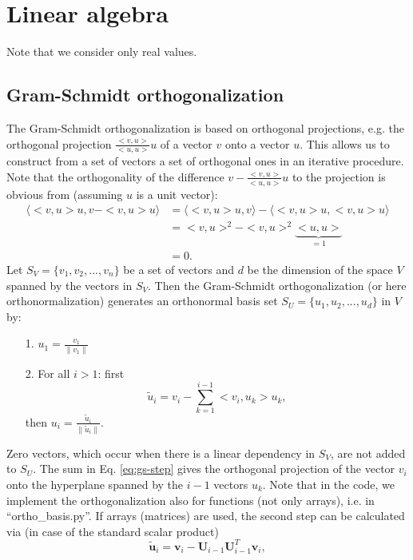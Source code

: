 \documentclass[11pt, a4paper, parskip=half*, bibliography=totoc, cleardoublepage=empty, final,
numbers=noenddot]{scrbook}
\begin{document}
\chapter{Linear algebra}
Note that we consider only real values.
\section{Gram-Schmidt orthogonalization}
The Gram-Schmidt orthogonalization is based on orthogonal projections, e.g. the orthogonal projection $\frac{<v, u>} {<u, u>} u$ of a vector $v$ onto a vector $u$. This allows us to construct from a set of vectors a set of orthogonal ones in an iterative procedure. Note that the orthogonality of the difference $v - \frac{<v, u>}{<u, u>} u$ to the projection is obvious from (assuming $u$ is a unit vector):
\begin{align}
\langle <v, u> u, v- <v, u> u \rangle &= \langle <v, u> u, v \rangle - \langle <v, u> u, <v, u> u \rangle \\
&= <v, u>^2 - <v, u>^2 \underbrace{<u, u>}_{=1} \\
&= 0.
\label{eq:orthogonal-proj-zero}
\end{align}
Let $S_V = \{v_1, v_2, ..., v_n\}$ be a set of vectors and $d$ be the dimension of the space $V$ spanned by the vectors in $S_V$. Then the Gram-Schmidt orthogonalization (or here orthonormalization) generates an orthonormal basis set $S_U = \{u_1, u_2, ..., u_d\}$ in $V$ by:
\begin{itemize}
\item[1.] $u_1 = \frac{v_1}{\| v_1\|}$
\item[2.] For all $i>1$: first
\begin{equation}
\tilde{u}_i = v_i - \sum_{k=1}^{i-1} <v_i, u_k> u_k     ,
\label{eq:gs-step}
\end{equation} 
then $u_i = \frac{\tilde{u}_i}{\| \tilde{u}_i\|}$.
\end{itemize}
Zero vectors, which occur when there is a linear dependency in $S_V$, are not added to $S_U$. The sum in Eq. \ref{eq:gs-step} gives the orthogonal projection of the vector $v_i$ onto the hyperplane spanned by the $i-1$ vectors $u_k$. Note that in the code, we implement the orthogonalization also for functions (not only arrays), i.e. in ``ortho\_basis.py''. If arrays (matrices) are used, the second step can be calculated via (in case of the standard scalar product)
\begin{equation}
\tilde{\bm{u}}_i = \bm{v}_i - \bm{U}_{i-1}  \bm{U}^T_{i-1}  \bm{v}_i     ,
\end{equation} 
\end{document}
